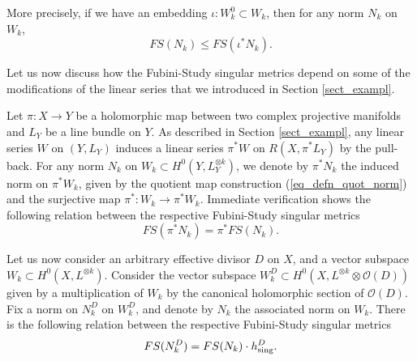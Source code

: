 \documentclass[12pt]{article}
\numberwithin{equation}{section}
\theoremstyle{theorem}
\theoremstyle{definition}
\theoremstyle{remark}
\begin{document}
	More precisely, if we have an embedding $\iota: W_k^0 \subset W_k$, then for any norm $N_k$ on $W_k$,
	\begin{equation}\label{eq_fs_monoton2}
		FS(N_k) \leq FS(\iota^* N_k).
	\end{equation}
	\par 
	Let us now discuss how the Fubini-Study singular metrics depend on some of the modifications of the linear series that we introduced in Section \ref{sect_exampl}.
	\par 
	Let $\pi : X \to Y$ be a holomorphic map between two complex projective manifolds and $L_Y$ be a line bundle on $Y$.
	As described in Section \ref{sect_exampl}, any linear series $W$ on $(Y, L_Y)$ induces a linear series $\pi^* W$ on $R(X, \pi^* L_Y)$ by the pull-back.
	For any norm $N_k$ on $W_k \subset H^0(Y, L_Y^{\otimes k})$, we denote by $\pi^* N_k$ the induced norm on $\pi^* W_k$, given by the quotient map construction (\ref{eq_defn_quot_norm}) and the surjective map $\pi^* : W_k \to \pi^* W_k$.
	Immediate verification shows the following relation between the respective Fubini-Study singular metrics
	\begin{equation}\label{eq_fs_pullback}
		FS(\pi^* N_k)
		=
		\pi^* FS(N_k).
	\end{equation}	 
	\par 
	\begin{sloppypar}
	Let us now consider an arbitrary effective divisor $D$ on $X$, and a vector subspace $W_k \subset H^0(X, L^{\otimes k})$.
	Consider the vector subspace $W_k^D \subset H^0(X, L^{\otimes k} \otimes \mathscr{O}(D))$ given by a multiplication of $W_k$ by the canonical holomorphic section of $\mathscr{O}(D)$.
	Fix a norm on $N_k^D$ on $W_k^D$, and denote by $N_k$ the associated norm on $W_k$.
	There is the following relation between the respective Fubini-Study singular metrics
	\begin{equation}\label{eq_fs_nkd}
		FS(N_k^D)
		=
		FS(N_k)
		\cdot
		h^{D}_{{\rm{sing}}}.
	\end{equation}
	\end{sloppypar}
	\par 
\end{document}
